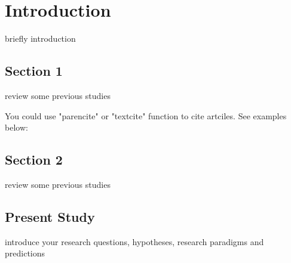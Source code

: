 \section{Introduction}

briefly introduction

\subsection{Section 1}

review some previous studies

You could use "parencite" or "textcite" function to cite artciles. See examples below:

\parencite{hauser_social_2019}

\textcite{Efferson2024super}

\subsection{Section 2}

review some previous studies

\subsection{Present Study}

introduce your research questions, hypotheses, research paradigms and predictions